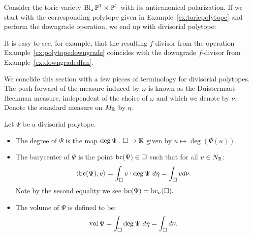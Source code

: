 \begin{example}
Consider the toric variety \(\operatorname{Bl}_z \mathbb{P}^1 \times \mathbb{P}^1\) with its anticanonical polarization. If we start with the corresponding polytope given in Example~\ref{ex:toricpolytope} and perform the downgrade operation, we end up with divisorial polytope:

\begin{figure}[H]
\centering

\label{fig:data230b}
\end{figure}

It is easy to see, for example, that the resulting \(f\)-divisor from the operation Example~\ref{ex:polytopedowngrade} coincides with the downgrade \(f\)-divisor from Example~\ref{ex:downgradedfan}.
\end{example}
We conclide this section with a few pieces of terminology for divisorial polytopes. The push-forward of the measure induced by \(\omega\) is known as the Duistermaat-Heckman measure, independent of the choice of \(\omega\) and which we denote by \(\nu\). Denote the standard measure on \(M_{\mathbb{R}}\) by \(\eta\).

\begin{definition} \label{def:divpoly2}
Let \(\Psi\) be a divisorial polytope.
\begin{itemize}
\item The degree of \(\Psi\) is the map \( \deg \Psi : \Box \to \mathbb{R}\) given by \( u \mapsto \deg (\Psi(u))\).
\item The barycenter of \(\Psi\) is the point \(\mathop{\rm bc}\nolimits(\Psi) \in \Box\) such that for all \(v \in N_{\mathbb{R}}\):
\[
\langle \mathop{\rm bc}\nolimits(\Psi), v \rangle = \int_\Box v \cdot \deg \Psi \ d \eta = \int_\Box v d \nu. 
\]
Note by the second equality we see \(\mathop{\rm bc}\nolimits(\Psi) = \mathop{\rm bc}\nolimits_\nu(\Box).\)
\item The volume of \(\Psi\) is defined to be:
\[
\mathop{\rm vol}\nolimits \Psi = \int_\Box \deg \Psi \ d \eta = \int_\Box d \nu.
\]
\end{itemize}
\end{definition}
